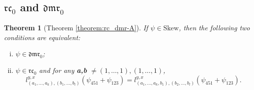 \documentclass[a4paper,fleqn]{cas-sc}
\newtheorem{theorem}{Theorem}
\begin{document}
\subsection{$\mathfrak{rc}_0$ and $\mathfrak{dmr}_0$}
\begin{theorem}[Theorem \ref{theorem:rc_dmr-A}]
\label{theorem:rc_dmr}
	If $\psi\in \mathrm{Skew}$, then the following two conditions are equivalent:
	\begin{enumerate}[(i)]
		\item \label{thm:rco-dmro-equiv-1}
        $\psi\in \mathfrak{dmr}_0$;
		\item \label{thm:rco-dmro-equiv-2}
        $\psi\in \mathfrak{rc}_0$ and for any %
        \textbf{a,b} $\ne (1,\dots,1),(1,\dots,1)$,
		\begin{equation}
        \label{eq:rco-dmro-equiv-2-condition2}
			l^{y,x}_{(a_1,\dots,a_k),(b_1,\dots,b_l)}(\psi_{451}+\psi_{123})=l^{y,x}_{(a_1,\dots,a_k,b_1),(b_2,\dots,b_l)}(\psi_{451}+\psi_{123}).
		\end{equation}
	\end{enumerate}
\end{theorem}
\end{document}
